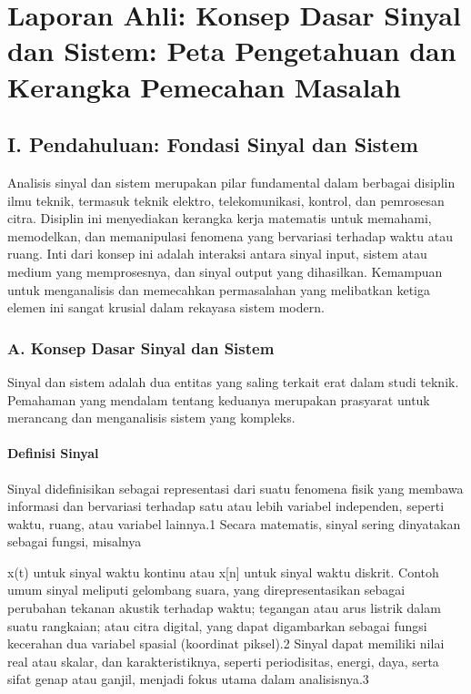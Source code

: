 \documentclass[
  letterpaper,
  DIV=11,
  numbers=noendperiod]{scrreprt}
\begin{document}

\chapter{Laporan Ahli: Konsep Dasar Sinyal dan Sistem: Peta Pengetahuan
dan Kerangka Pemecahan
Masalah}\label{laporan-ahli-konsep-dasar-sinyal-dan-sistem-peta-pengetahuan-dan-kerangka-pemecahan-masalah}

\section{I. Pendahuluan: Fondasi Sinyal dan
Sistem}\label{i.-pendahuluan-fondasi-sinyal-dan-sistem}

Analisis sinyal dan sistem merupakan pilar fundamental dalam berbagai
disiplin ilmu teknik, termasuk teknik elektro, telekomunikasi, kontrol,
dan pemrosesan citra. Disiplin ini menyediakan kerangka kerja matematis
untuk memahami, memodelkan, dan memanipulasi fenomena yang bervariasi
terhadap waktu atau ruang. Inti dari konsep ini adalah interaksi antara
sinyal input, sistem atau medium yang memprosesnya, dan sinyal output
yang dihasilkan. Kemampuan untuk menganalisis dan memecahkan
permasalahan yang melibatkan ketiga elemen ini sangat krusial dalam
rekayasa sistem modern.

\subsection{A. Konsep Dasar Sinyal dan
Sistem}\label{a.-konsep-dasar-sinyal-dan-sistem}

Sinyal dan sistem adalah dua entitas yang saling terkait erat dalam
studi teknik. Pemahaman yang mendalam tentang keduanya merupakan
prasyarat untuk merancang dan menganalisis sistem yang kompleks.

\subsubsection{Definisi Sinyal}\label{definisi-sinyal}

Sinyal didefinisikan sebagai representasi dari suatu fenomena fisik yang
membawa informasi dan bervariasi terhadap satu atau lebih variabel
independen, seperti waktu, ruang, atau variabel lainnya.1 Secara
matematis, sinyal sering dinyatakan sebagai fungsi, misalnya

x(t) untuk sinyal waktu kontinu atau x{[}n{]} untuk sinyal waktu
diskrit. Contoh umum sinyal meliputi gelombang suara, yang
direpresentasikan sebagai perubahan tekanan akustik terhadap waktu;
tegangan atau arus listrik dalam suatu rangkaian; atau citra digital,
yang dapat digambarkan sebagai fungsi kecerahan dua variabel spasial
(koordinat piksel).2 Sinyal dapat memiliki nilai real atau skalar, dan
karakteristiknya, seperti periodisitas, energi, daya, serta sifat genap
atau ganjil, menjadi fokus utama dalam analisisnya.3
\end{document}
